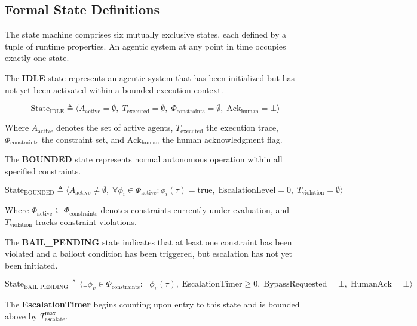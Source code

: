 \subsection{Formal State Definitions}

The state machine comprises six mutually exclusive states, each defined by a tuple of runtime properties. An agentic system at any point in time occupies exactly one state.

\begin{definition}
The \textbf{IDLE} state represents an agentic system that has been initialized but has not yet been activated within a bounded execution context. 

\[
\text{State}_{\text{IDLE}} \triangleq \langle A_{\text{active}} = \emptyset,\; T_{\text{executed}} = \emptyset,\; \Phi_{\text{constraints}} = \emptyset,\; \text{Ack}_{\text{human}} = \bot \rangle
\]

Where $A_{\text{active}}$ denotes the set of active agents, $T_{\text{executed}}$ the execution trace, $\Phi_{\text{constraints}}$ the constraint set, and $\text{Ack}_{\text{human}}$ the human acknowledgment flag.
\end{definition}

\begin{definition}
The \textbf{BOUNDED} state represents normal autonomous operation within all specified constraints.

\[
\text{State}_{\text{BOUNDED}} \triangleq \langle A_{\text{active}} \neq \emptyset,\; \forall \phi_i \in \Phi_{\text{active}}: \phi_i(\tau) = \text{true},\; \text{EscalationLevel} = 0,\; T_{\text{violation}} = \emptyset \rangle
\]

Where $\Phi_{\text{active}} \subseteq \Phi_{\text{constraints}}$ denotes constraints currently under evaluation, and $T_{\text{violation}}$ tracks constraint violations.
\end{definition}

\begin{definition}
The \textbf{BAIL\_PENDING} state indicates that at least one constraint has been violated and a bailout condition has been triggered, but escalation has not yet been initiated.

\[
\text{State}_{\text{BAIL\_PENDING}} \triangleq \langle \exists \phi_v \in \Phi_{\text{constraints}}: \neg\phi_v(\tau),\; \text{EscalationTimer} \geq 0,\; \text{BypassRequested} = \bot,\; \text{HumanAck} = \bot \rangle
\]

The \textbf{EscalationTimer} begins counting upon entry to this state and is bounded above by $T_{\text{escalate}}^{\max}$.
\end{definition}

